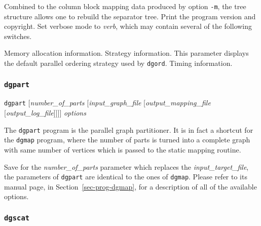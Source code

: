 \begin{itemize}
\begin{itemize}
Combined to the column block mapping data produced by option {\tt -m},
the tree structure allows one to rebuild the separator tree.
\iteme[{\tt -V}]
Print the program version and copyright.
\iteme[{\tt -v}{\it verb}]
Set verbose mode to {\it verb}, which may contain several of the following
switches.
\begin{itemize}
\iteme[{\tt a}]
Memory allocation information.
\iteme[{\tt s}]
Strategy information. This parameter displays the default parallel
ordering strategy used by {\tt dgord}.
\iteme[{\tt t}]
Timing information.
\end{itemize}
\end{itemize}
\end{itemize}

\subsubsection{{\tt dgpart}}

\begin{itemize}
\progsyn
{\tt dgpart} [{\it number\_of\_parts} [{\it input\_\lbt graph\_\lbt file} [{\it output\_\lbt mapping\_\lbt file} [{\it output\_\lbt log\_\lbt file}]]]] {\it options}

\progdes

The {\tt dgpart} program is the parallel graph partitioner. It is
in fact a shortcut for the {\tt dgmap} program, where the number of
parts is turned into a complete graph with same number of vertices
which is passed to the static mapping routine.

Save for the {\it number\_of\_parts} parameter which replaces the {\it
input\_target\_file}, the parameters of {\tt dgpart} are identical to
the ones of {\tt dgmap}. Please refer to its manual page, in
Section~\ref{sec-prog-dgmap}, for a description of all of the
available options.
\end{itemize}

\subsubsection{{\tt dgscat}}


